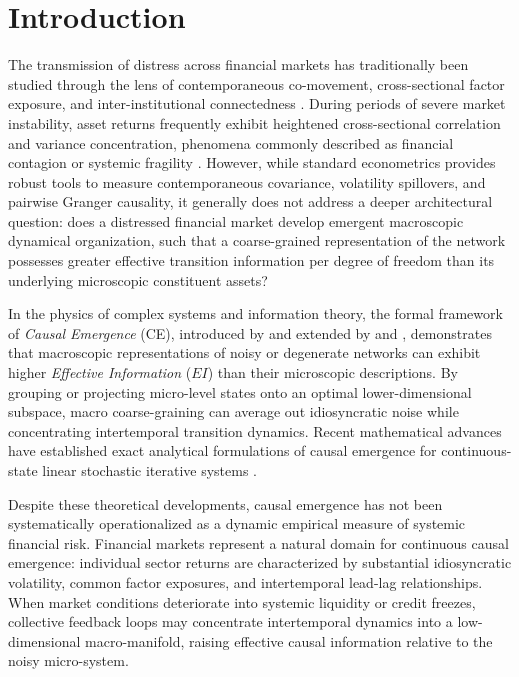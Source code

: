 \documentclass[review,12pt,authoryear]{elsarticle}
\begin{document}
\doublespacing

\section{Introduction}
\label{sec:intro}

The transmission of distress across financial markets has traditionally been studied through the lens of contemporaneous co-movement, cross-sectional factor exposure, and inter-institutional connectedness \citep{billio2012econometric, diebold2012better, adrian2016covar, brownlees2017srisk}. During periods of severe market instability, asset returns frequently exhibit heightened cross-sectional correlation and variance concentration, phenomena commonly described as financial contagion or systemic fragility \citep{acharya2017measuring, kritzman2011principal}. However, while standard econometrics provides robust tools to measure contemporaneous covariance, volatility spillovers, and pairwise Granger causality, it generally does not address a deeper architectural question: does a distressed financial market develop emergent macroscopic dynamical organization, such that a coarse-grained representation of the network possesses greater effective transition information per degree of freedom than its underlying microscopic constituent assets?

In the physics of complex systems and information theory, the formal framework of \emph{Causal Emergence} (CE), introduced by \citet{hoel2013quantifying} and extended by \citet{klein2020emergence} and \citet{rosas2020reconciling}, demonstrates that macroscopic representations of noisy or degenerate networks can exhibit higher \emph{Effective Information} ($EI$) than their microscopic descriptions. By grouping or projecting micro-level states onto an optimal lower-dimensional subspace, macro coarse-graining can average out idiosyncratic noise while concentrating intertemporal transition dynamics. Recent mathematical advances have established exact analytical formulations of causal emergence for continuous-state linear stochastic iterative systems \citep{liu2024exact, liu2025singular, yang2025finding}. 

Despite these theoretical developments, causal emergence has not been systematically operationalized as a dynamic empirical measure of systemic financial risk. Financial markets represent a natural domain for continuous causal emergence: individual sector returns are characterized by substantial idiosyncratic volatility, common factor exposures, and intertemporal lead-lag relationships. When market conditions deteriorate into systemic liquidity or credit freezes, collective feedback loops may concentrate intertemporal dynamics into a low-dimensional macro-manifold, raising effective causal information relative to the noisy micro-system.
\end{document}
